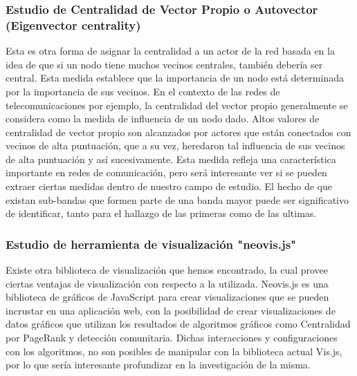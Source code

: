 \subsubsection{Estudio de Centralidad de Vector Propio o Autovector (Eigenvector centrality)} Esta es otra forma de asignar la centralidad a un actor de la red basada en la idea de que si un nodo tiene muchos vecinos centrales, también debería ser central. Esta medida establece que la importancia de un nodo está determinada por la importancia de sus vecinos. En el contexto de las redes de telecomunicaciones por ejemplo, la centralidad del vector propio generalmente se considera como la medida de influencia de un nodo dado. Altos valores de centralidad de vector propio son alcanzados por actores que están conectados con vecinos de alta puntuación, que a su vez, heredaron tal influencia de sus vecinos de alta puntuación y así sucesivamente. Esta medida refleja una característica importante en redes de comunicación, pero será interesante ver si se pueden extraer ciertas medidas dentro de nuestro campo de estudio. El hecho de que existan sub-bandas que formen parte de una banda mayor puede ser significativo de identificar, tanto para el hallazgo de las primeras como de las ultimas. 

\subsubsection{Estudio de herramienta de visualización "neovis.js"} Existe otra biblioteca de visualización que hemos encontrado, la cual provee ciertas ventajas de visualización con respecto a la utilizada. Neovis.js es una biblioteca de gráficos de JavaScript para crear visualizaciones que se pueden incrustar en una aplicación web, con la posibilidad de crear visualizaciones de datos gráficos que utilizan los resultados de algoritmos gráficos como Centralidad por PageRank y detección comunitaria. Dichas interacciones y configuraciones con los algoritmos, no son posibles de manipular con la biblioteca actual Vis.js, por lo que sería interesante profundizar en la investigación de la misma. 